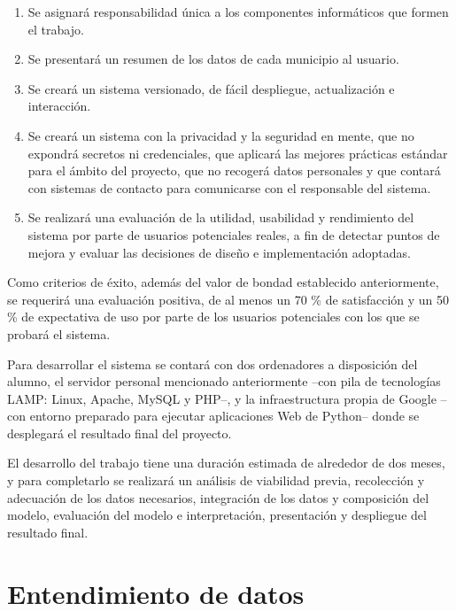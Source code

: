 \begin{enumerate}
    \item Se asignará responsabilidad única a los componentes informáticos que formen el trabajo.
    \item Se presentará un resumen de los datos de cada municipio al usuario.
    \item Se creará un sistema versionado, de fácil despliegue, actualización e interacción.
    \item Se creará un sistema con la privacidad y la seguridad en mente, que no expondrá secretos ni credenciales, que aplicará las mejores prácticas estándar para el ámbito del proyecto, que no recogerá datos personales y que contará con sistemas de contacto para comunicarse con el responsable del sistema.
    \item Se realizará una evaluación de la utilidad, usabilidad y rendimiento del sistema por parte de usuarios potenciales reales, a fin de detectar puntos de mejora y evaluar las decisiones de diseño e implementación adoptadas.
\end{enumerate}

Como criterios de éxito, además del valor de bondad establecido anteriormente, se requerirá una evaluación positiva, de al menos un 70 \% de satisfacción y un 50 \% de expectativa de uso por parte de los usuarios potenciales con los que se probará el sistema.

Para desarrollar el sistema se contará con dos ordenadores a disposición del alumno, el servidor personal mencionado anteriormente –con pila de tecnologías LAMP: Linux, Apache, MySQL y PHP–, y la infraestructura propia de Google –con entorno preparado para ejecutar aplicaciones Web de Python– donde se desplegará el resultado final del proyecto.

El desarrollo del trabajo tiene una duración estimada de alrededor de dos meses, y para completarlo se realizará un análisis de viabilidad previa, recolección y adecuación de los datos necesarios, integración de los datos y composición del modelo, evaluación del modelo e interpretación, presentación y despliegue del resultado final.

\section{Entendimiento de datos}

